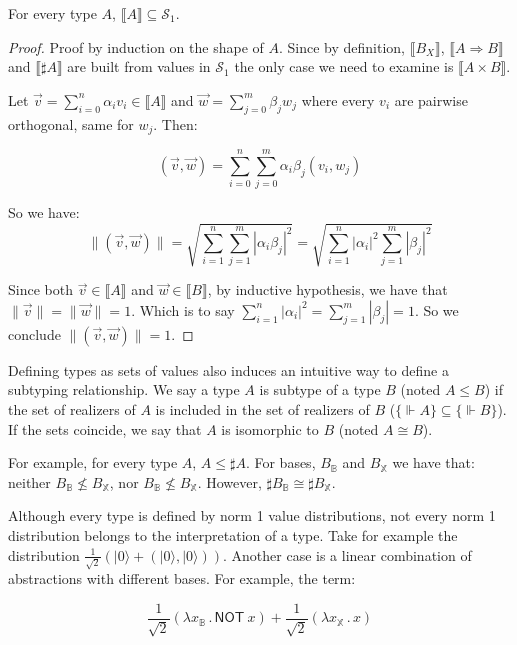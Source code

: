 \documentclass[runningheads,orivec,envcountsame,envcountsect]{llncs}
\newcommand\ket[1]{\ensuremath{|#1\rangle}}
\def\Sph{\mathcal{S}_1}       %
\def\Pair#1#2{(#1,#2)} %
\def\Lam#1#2#3{\lambda#1_{#2}\,{.}\,#3} %
\def\Arr{\Rightarrow}
\def\sem#1{\llbracket#1\rrbracket}
\def\real{\Vdash}
\newcommand\B{\mathbb B}
\newcommand\XB{\mathbb X}
\newcommand{\pauliX}[1]{\mathsf{NOT}\ #1}
\newcommand\basis[1]{\ensuremath{B_{ #1 }}}
\begin{document}
\begin{theorem}\label{prop:UnitaryTypes}
  For every type $A$, $\sem{A}\subseteq\Sph$.
\end{theorem}

\begin{proof}
  Proof by induction on the shape of $A$. Since by definition, $\sem{\basis{X}}$, $\sem{A\Arr B}$ and $\sem{\sharp{A}}$ are built from values in $\Sph$ the only case we need to examine is $\sem{A\times B}$.
  
  Let $\vec v = \sum_{i=0}^{n} \alpha_i v_i \in\sem{A}$ and $\vec w = \sum_{j=0}^{m} \beta_j w_j$ where every $v_i$ are pairwise orthogonal, same for $w_j$. Then:
     
  \[(\vec v, \vec w) = \sum_{i=0}^{n} \sum_{j=0}^{m} \alpha_i\beta_j (v_i,w_j)\]
  
  So we have: 
  \[\|\Pair{\vec v}{\vec w}\| = \sqrt{\sum_{i=1}^n\sum_{j=1}^{m} |\alpha_i\beta_j|^2} = \sqrt{\sum_{i=1}^n |\alpha_i|^2 \sum_{j=1}^{m} |\beta_j|^2}\]

  Since both $\vec v\in\sem{A}$ and $\vec w\in\sem{B}$, by inductive hypothesis, we have that $\|\vec v\| = \| \vec w \| = 1$. Which is to say $\sum_{i=1}^{n} |\alpha_i|^2 = \sum_{j=1}^{m} |\beta_j| = 1$. So we conclude $\|\Pair{\vec{v}}{\vec{w}}\| = 1$.
  
\end{proof}

Defining types as sets of values also induces an intuitive way to define a subtyping relationship. We say a type $A$ is subtype of a type $B$ (noted $A\leq B$) if the set of realizers of $A$ is included in the set of realizers of $B$ ($\{\real A\}\subseteq\{\real B\}$). If the sets coincide, we say that $A$ is isomorphic to $B$ (noted $A\cong B$). 

\begin{example}
  For example, for every type $A$, $A\leq\sharp A$. For bases, $\basis{\B}$ and $\basis{\XB}$ we have that: neither $\basis{\B}\not\leq\basis{\XB}$, nor $\basis{\B}\not\leq\basis{\XB}$. However, $\sharp\basis{\B}\cong\sharp\basis{\XB}$.
\end{example}

Although every type is defined by norm 1 value distributions, not every norm 1 distribution belongs to the interpretation of a type. Take for example the distribution $\frac{1}{\sqrt{2}} (\ket{0} + \Pair{\ket{0}}{\ket 0})$. Another case is a linear combination of abstractions with different bases. For example, the term:

\[
\frac{1}{\sqrt{2}}(\Lam{x}{\B}{\pauliX{x}}) + \frac{1}{\sqrt{2}}(\Lam{x}{\XB}{x})
\]
\end{document}
